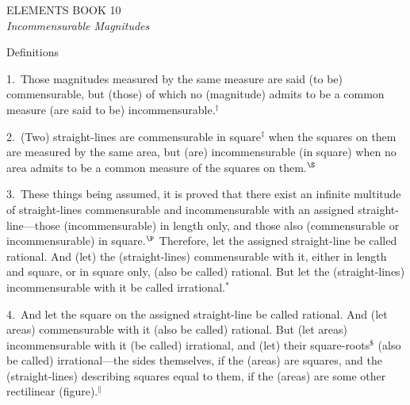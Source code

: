 \pagestyle{plain}
\begin{center}
{\Huge ELEMENTS BOOK 10}\\
\spa\spa\spa
{\huge\it Incommensurable Magnitudes}
\end{center}\newpage

\pagestyle{fancy}
\cfoot{\gr{\thepage}}

\begin{center}
{\large Definitions}
\end{center}

1.~Those magnitudes   measured by the
same measure are said (to be) commensurable, but (those)
of which no (magnitude) admits to be  a common measure (are said to be)
incommensurable.$^\dag$

2.~(Two) straight-lines are commensurable in square$^\ddag$ when the squares on
them are measured by the same area, but (are) incommensurable (in square)
when no area admits to be a common measure of the squares on them.$^\S$

3.~These things being assumed, it is proved that there
exist an infinite multitude of straight-lines commensurable and
incommensurable with an assigned straight-line---those  (incommensurable) in length only, and
those also (commensurable or incommensurable) in square.$^\P$ 
Therefore, let
the assigned straight-line be called rational. And (let) the (straight-lines) commensurable
with it, either in length and square, or in square only, (also be called) rational. But let the (straight-lines) incommensurable with it be called
irrational.$^\ast$ 

4.~And let the square on the assigned straight-line be called  rational. And (let areas) commensurable with it (also be called) rational. But  (let areas) incommensurable with it (be called) irrational, and (let) their square-roots$^\$$ (also be called) irrational---the sides themselves, if the (areas)
are squares, and the (straight-lines) describing squares equal to them, if the (areas) are some other rectilinear (figure).$^\|$

